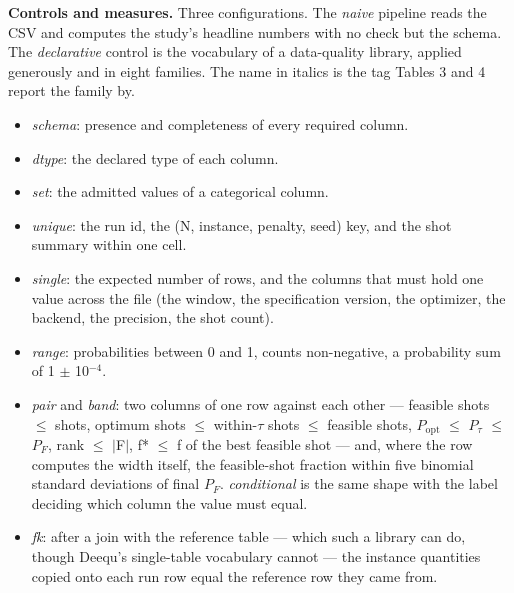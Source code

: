 \documentclass[acmsmall,screen,review]{acmart}
\begin{document}
\textbf{Controls and measures.} Three configurations. The \textit{naive} pipeline reads the CSV and computes the study's headline numbers with no check but the schema. The \textit{declarative} control is the vocabulary of a data-quality library, applied generously and in eight families. The name in italics is the tag Tables 3 and 4 report the family by.


\begin{itemize}
\item \textit{schema}: presence and completeness of every required column.
\item \textit{dtype}: the declared type of each column.
\item \textit{set}: the admitted values of a categorical column.
\item \textit{unique}: the run id, the (N, instance, penalty, seed) key, and the shot summary within one cell.
\item \textit{single}: the expected number of rows, and the columns that must hold one value across the file (the window, the specification version, the optimizer, the backend, the precision, the shot count).
\item \textit{range}: probabilities between 0 and 1, counts non-negative, a probability sum of 1 $\pm$ 10$^{-4}$.
\item \textit{pair} and \textit{band}: two columns of one row against each other --- feasible shots $\leq$ shots, optimum shots $\leq$ within-$\tau$ shots $\leq$ feasible shots, $P_{\mathrm{opt}}$ $\leq$ $P_{\tau}$ $\leq$ $P_{F}$, rank $\leq$ $|$F$|$, f* $\leq$ f of the best feasible shot --- and, where the row computes the width itself, the feasible-shot fraction within five binomial standard deviations of final $P_{F}$. \textit{conditional} is the same shape with the label deciding which column the value must equal.
\item \textit{fk}: after a join with the reference table --- which such a library can do, though Deequ's single-table vocabulary cannot --- the instance quantities copied onto each run row equal the reference row they came from.
\end{itemize}
\end{document}
